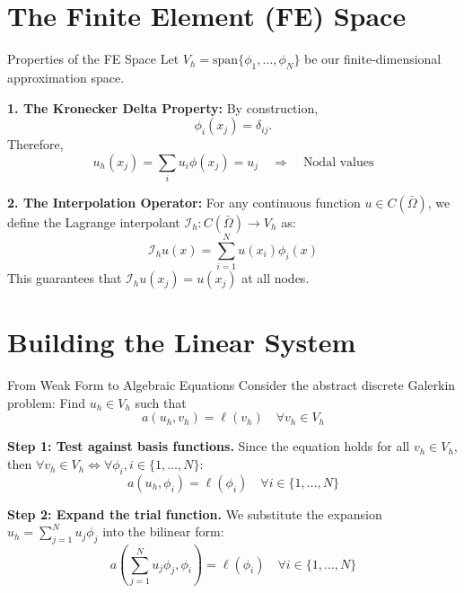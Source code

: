 \documentclass[aspectratio=169]{beamer}
\begin{document}
\section{The Finite Element (FE) Space}

\begin{frame}{Properties of the FE Space}
    Let $V_h = \text{span}\{\phi_1, \dots, \phi_N\}$ be our finite-dimensional approximation space.
    
    \vspace{0.3cm}
    \textbf{1. The Kronecker Delta Property:}
    By construction, 
    $$\phi_i(x_j) = \delta_{ij}.$$
    Therefore, 
$$ u_h(x_j) = \sum_i u_i \phi(x_j) = u_j \quad\Rightarrow\quad \text{Nodal values} $$
    
    \vspace{0.3cm}
    \pause \textbf{2. The Interpolation Operator:}
For any continuous function $u \in C(\bar{\Omega})$, we define the Lagrange interpolant $\mathcal{I}_h: C(\bar{\Omega}) \to V_h$  as:
    $$ \mathcal{I}_h u(x) = \sum_{i=1}^N u(x_i) \phi_i(x) $$
    This guarantees that $\mathcal{I}_h u(x_j) = u(x_j)$ at all nodes.
\end{frame}

\section{Building the Linear System}

\begin{frame}{From Weak Form to Algebraic Equations}
    Consider the abstract discrete Galerkin problem: Find $u_h \in V_h$ such that
    $$ a(u_h, v_h) = \ell(v_h) \quad \forall v_h \in V_h $$


    \vspace{0.3cm}
    \pause\textbf{Step 1: Test against basis functions.}
    Since the equation holds for all $v_h \in V_h$, then $\forall v_h \in V_h \Leftrightarrow \forall \phi_i, i\in \{1,\dots, N\}$:
    $$ a(u_h, \phi_i) = \ell(\phi_i) \quad \forall i \in \{1, \dots, N\} $$

    \vspace{0.3cm}
    \pause\textbf{Step 2: Expand the trial function.}
    We substitute the expansion $u_h = \sum_{j=1}^N u_j \phi_j$ into the bilinear form:
    $$ a\left(\sum_{j=1}^N u_j \phi_j, \phi_i\right) = \ell(\phi_i) \quad \forall i \in \{1, \dots, N\} $$
\end{frame}
\end{document}
